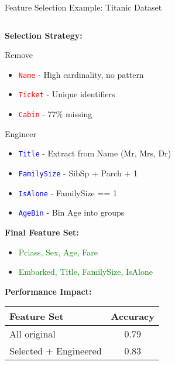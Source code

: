 \documentclass[8pt,aspectratio=1610]{beamer}
\begin{document}
\begin{frame}{Feature Selection Example: Titanic Dataset}
\begin{columns}[t]
\begin{column}{0.48\textwidth}
\textbf{Selection Strategy:}
\vspace{0.2cm}

\begin{alertblock}{Remove}
\begin{itemize}
\setlength{\itemsep}{1pt}
\item \textcolor{red}{\texttt{Name}} - High cardinality, no pattern
\item \textcolor{red}{\texttt{Ticket}} - Unique identifiers
\item \textcolor{red}{\texttt{Cabin}} - 77\% missing
\end{itemize}
\end{alertblock}

\begin{block}{Engineer}
\begin{itemize}
\setlength{\itemsep}{1pt}
\item \textcolor{blue}{\texttt{Title}} - Extract from Name (Mr, Mrs, Dr)
\item \textcolor{blue}{\texttt{FamilySize}} - SibSp + Parch + 1
\item \textcolor{blue}{\texttt{IsAlone}} - FamilySize == 1
\item \textcolor{blue}{\texttt{AgeBin}} - Bin Age into groups
\end{itemize}
\end{block}

\textbf{Final Feature Set:}
\begin{itemize}
\setlength{\itemsep}{1pt}
\item \textcolor{green}{Pclass, Sex, Age, Fare}
\item \textcolor{green}{Embarked, Title, FamilySize, IsAlone}
\end{itemize}

\vspace{0.2cm}
\textbf{Performance Impact:}
\scriptsize
\begin{tabular}{|l|c|}
\hline
\textbf{Feature Set} & \textbf{Accuracy} \\
\hline
All original & 0.79 \\
Selected + Engineered & 0.83 \\
\hline
\end{tabular}
\end{column}
\end{columns}
\end{frame}
\end{document}
